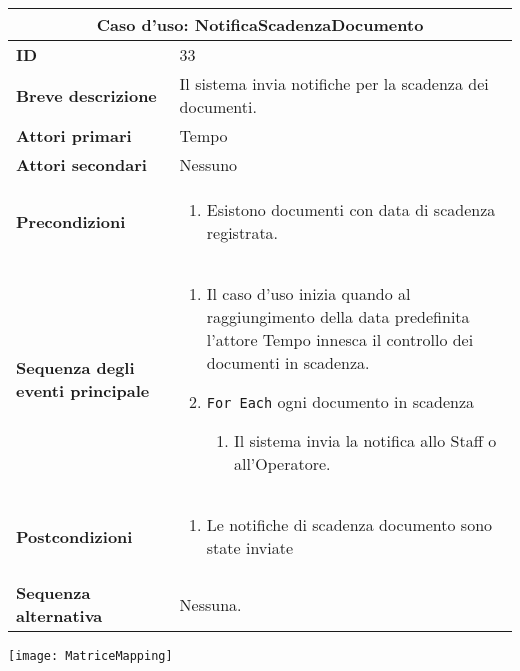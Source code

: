 \documentclass[a4paper]{report}
\begin{document}
\clearpage
\begin{table}[H]
\vspace*{-0cm}
\renewcommand{\arraystretch}{1.9}
\begin{tabular}{|p{3.9cm}|p{9.9cm}|}
\hline
\multicolumn{2}{|c|}{\textbf{Caso d’uso: NotificaScadenzaDocumento}} \\ \hline
	\textbf{ID} & 33 \\ \hline
	\textbf{Breve descrizione} & Il sistema invia notifiche per la scadenza dei documenti. \\ \hline
	\textbf{Attori primari} & Tempo \\ \hline
	\textbf{Attori secondari} & Nessuno \\ \hline
	\textbf{Precondizioni} & \begin{enumerate}[leftmargin=14pt,label=\arabic*.,labelsep=0.5em,topsep=0pt,partopsep=0pt,parsep=0pt,itemsep=0pt]
        \item Esistono documenti con data di scadenza registrata.
    \end{enumerate} \\ \hline
	\textbf{Sequenza degli eventi principale} & 
\begin{enumerate}[leftmargin=14pt,label=\arabic*.,labelsep=0.5em,topsep=0pt,partopsep=0pt,parsep=0pt,itemsep=0pt]
    \item Il caso d’uso inizia quando al raggiungimento della data predefinita l’attore Tempo innesca il controllo dei documenti in scadenza.
    \item \texttt{For Each} ogni documento in scadenza
    \begin{enumerate}[label=\arabic{enumi}.\arabic*.,leftmargin=22pt,labelsep=0.5em,topsep=0pt,partopsep=0pt,parsep=0pt,itemsep=0pt]
        \item Il sistema invia la notifica allo Staff o all’Operatore.
    \end{enumerate}
\end{enumerate}\\ \hline
	\textbf{Postcondizioni} & \begin{enumerate}[label=\arabic*.,leftmargin=14pt,labelsep=0.5em,topsep=0pt,partopsep=0pt,parsep=0pt,itemsep=0pt]
        \item Le notifiche di scadenza documento sono state inviate
    \end{enumerate} \\ \hline
	\textbf{Sequenza alternativa} & Nessuna. \\ \hline
\end{tabular}
\end{table}

\clearpage
{}

\begin{figure*}[!ht]
    \centering
    \texttt{[image: MatriceMapping]}
\end{figure*}


\end{document}
